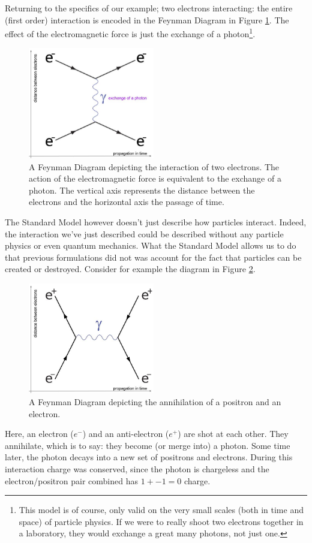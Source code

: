 Returning to the specifics of our example; two electrons interacting: the entire (first order) interaction is encoded in the Feynman Diagram in Figure \ref{Fig:Intro:Feynman1}. The effect of the electromagnetic force is just the exchange of a photon\footnote{This model is of course, only valid on the very small scales (both in time and space) of particle physics. If we were to really shoot two electrons together in a laboratory, they would exchange a great many photons, not just one.}. 
\begin{figure}[h]
    \centering
        \includegraphics[width=0.49\textwidth]{F1/FeynDiag1}
        \caption{A Feynman Diagram depicting the interaction of two electrons. The action of the electromagnetic force is equivalent to the exchange of a photon. The vertical axis represents the distance between the electrons and the horizontal axis the passage of time.}
        \label{Fig:Intro:Feynman1}
\end{figure}
The Standard Model however doesn't just describe how particles interact. Indeed, the interaction we've just described could be described without any particle physics or even quantum mechanics. What the Standard Model allows us to do that previous formulations did not was account for the fact that particles can be created or destroyed. Consider for example the diagram in Figure \ref{Fig:Intro:Feynman2}. 
\begin{figure}[h]
    \centering
        \includegraphics[width=0.49\textwidth]{F1/FeynDiag2}
        \caption{A Feynman Diagram depicting the annihilation of a positron and an electron.}
        \label{Fig:Intro:Feynman2}
\end{figure}
Here, an electron ($e^-$) and an anti-electron ($e^+$) are shot at each other. They annihilate, which is to say: they become (or merge into) a photon. Some time later, the photon decays into a new set of positrons and electrons. During this interaction charge was conserved, since the photon is chargeless and the electron/positron pair combined has $1 + -1 = 0$ charge.

